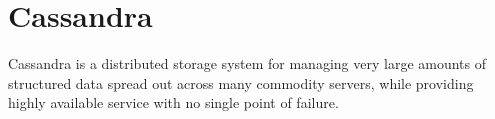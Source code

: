 \chapter{Cassandra}

Cassandra is a distributed storage system for managing very
large  amounts  of  structured  data  spread  out  across  many
commodity servers, while providing highly available service
with no single point of failure. \autocite{lakshman2010cassandra}
